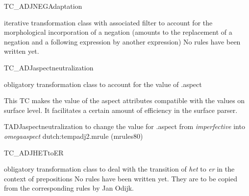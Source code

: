 \begin{mruleclass}{TC\_ADJNEGAdaptation}
\begin{classdescr}
\kind iterative transformation class with associated filter
\classtask to account for the morphological incorporation of a negation
(amounts to the replacement of a negation and a following expression by another 
expression)
\classremarks\mbox{} No rules have been written yet. 
\nofilters

\nospeedrules

\noplannedrules

\norulesnotince


\end{classdescr}
\end{mruleclass}

\begin{mruleclass}{TC\_ADJaspectneutralization}
\begin{classdescr}
\kind obligatory transformation  class
\classtask to account for the value of .aspect
\classremarks\mbox{} 

This TC makes the value of the aspect attributes compatible with the
values on surface level. 
It facilitates a certain amount of  efficiency in the surface parser. 
\nofilters

\nospeedrules

\noplannedrules

\norulesnotince


\end{classdescr}

\begin{members}
\begin{member}
 TADJaspectneutralization
 to change the value for .aspect from {\em imperfective} into 
{\em omegaaspect}
\file dutch:tempadj2.mrule (mrules80)
\semantics \nosemantics
\example 
\remarks\mbox{} 
\end{member}
\end{members}

\end{mruleclass}

\begin{mruleclass}{TC\_ADJHETtoER}
\begin{classdescr}
\kind obligatory transformation class
\classtask 
to deal with the transition of {\em het} to {\em er} in the context of 
prepositions
\classremarks\mbox{} No rules have been written yet. They are to be copied from the
corresponding rules by Jan Odijk.
\nofilters

\nospeedrules

\noplannedrules

\norulesnotince


\end{classdescr}
\end{mruleclass}

